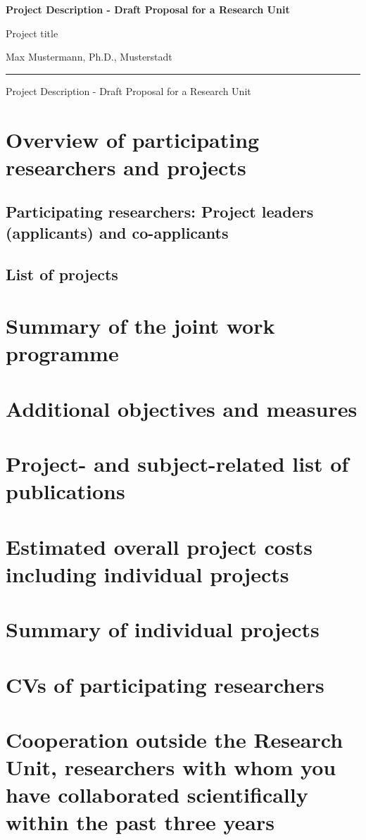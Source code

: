 \documentclass[english, 53.20]{proposal}
\newcommand{\spokesperson}{Max Mustermann, Ph.D., Musterstadt}
\newcommand{\project}{Project title}
\begin{document}
{\raggedright{} \normalsize \bfseries
	Project Description - Draft Proposal for a Research Unit \par
    \project{} \par
    \spokesperson{} \par
	\rule{\textwidth}{0.5pt} \par
	Project Description - Draft Proposal for a Research Unit
}

\section{Overview of participating researchers and projects}

\subsection{Participating researchers: Project leaders (applicants) and co-applicants}

\subsection{List of projects}


\section{Summary of the joint work programme}


\section{Additional objectives and measures}


\section{Project- and subject-related list of publications}
\printbibliography[heading=none]


\section{Estimated overall project costs including individual projects}


\section{Summary of individual projects}


\section{CVs of participating researchers}


\section{Cooperation outside the Research Unit, researchers with whom you have collaborated scientifically within the past three years}
\end{document}
